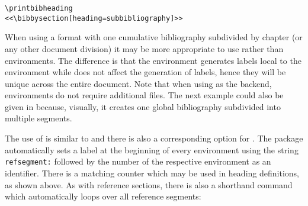 \begin{lstlisting}[style=latex]
\printbibheading
<<\bibbysection[heading=subbibliography]>>
\end{lstlisting}
%
When using a format with one cumulative bibliography subdivided by chapter (or any other document division) it may be more appropriate to use  rather than  environments. The difference is that the  environment generates labels local to the environment while  does not affect the generation of labels, hence they will be unique across the entire document. Note that when using \bibtex as the backend,  environments do not require additional  files. The next example could also be given in  because, visually, it creates one global bibliography subdivided into multiple segments.

%
The use of  is similar to  and there is also a corresponding  option for . The \biblatex package automatically sets a label at the beginning of every  environment using the string \texttt{refsegment:} followed by the number of the respective  environment as an identifier. There is a matching  counter which may be used in heading definitions, as shown above. As with reference sections, there is also a shorthand command which automatically loops over all reference segments:

